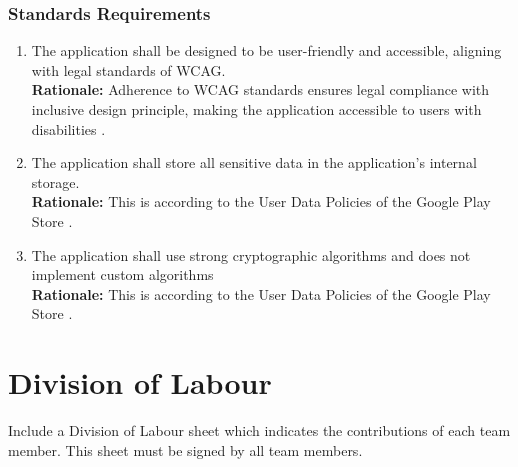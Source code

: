 \documentclass[]{article}
\begin{document}
\subsubsection{Standards Requirements}
\label{ssub:standards_requirements}
\begin{enumerate}[{LR-STD}1. ]
    \item The application shall be designed to be user-friendly and accessible, aligning with legal standards of WCAG. \\
    {\bf Rationale:} Adherence to WCAG standards ensures legal compliance with inclusive design principle, making the application accessible to users with disabilities
    \cite{2c}.
    \item The application shall store all sensitive data in the application's internal storage. \\
    {\bf Rationale:} This is according to the User Data Policies of the Google Play Store
    \cite{11c}.
    \item The application shall use strong cryptographic algorithms and does not implement custom algorithms \\
    {\bf Rationale:} This is according to the User Data Policies of the Google Play Store
    \cite{11c}.
\end{enumerate}
\appendix
\section{Division of Labour}
\label{sec:division_of_labour}
Include a Division of Labour sheet which indicates the contributions of each team member. This sheet must be signed by all team members.
\end{document}
